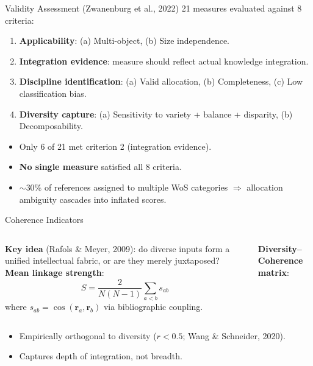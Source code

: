 \documentclass[aspectratio=169,10pt]{beamer}
\begin{document}
\begin{frame}{Validity Assessment (Zwanenburg et al., 2022)}
21 measures evaluated against 8 criteria:
\begin{enumerate}\small
  \item \textbf{Applicability}: (a) Multi-object, (b) Size independence.
  \item \textbf{Integration evidence}: measure should reflect actual
        knowledge integration.
  \item \textbf{Discipline identification}: (a) Valid allocation,
        (b) Completeness, (c) Low classification bias.
  \item \textbf{Diversity capture}: (a) Sensitivity to variety + balance + disparity,
        (b) Decomposability.
\end{enumerate}
\medskip
\begin{itemize}
  \item Only 6 of 21 met criterion 2 (integration evidence).
  \item \textbf{No single measure} satisfied all 8 criteria.
  \item $\sim$30\% of references assigned to multiple WoS categories
        $\Rightarrow$ allocation ambiguity cascades into inflated scores.
\end{itemize}
\end{frame}

\begin{frame}{Coherence Indicators}
\begin{columns}[T]
\textbf{Key idea} (Rafols \& Meyer, 2009): do diverse inputs form a
unified intellectual fabric, or are they merely juxtaposed?
\medskip
\textbf{Mean linkage strength}:
\[
  S = \frac{2}{N(N-1)} \sum_{a < b} s_{ab}
\]
where $s_{ab} = \cos(\mathbf{r}_a, \mathbf{r}_b)$ via
bibliographic coupling.

\textbf{Diversity--Coherence matrix}:
\medskip
{}
\end{columns}
\medskip
\begin{itemize}
  \item Empirically orthogonal to diversity ($r < 0.5$; Wang \& Schneider, 2020).
  \item Captures depth of integration, not breadth.
\end{itemize}
\end{frame}
\end{document}
